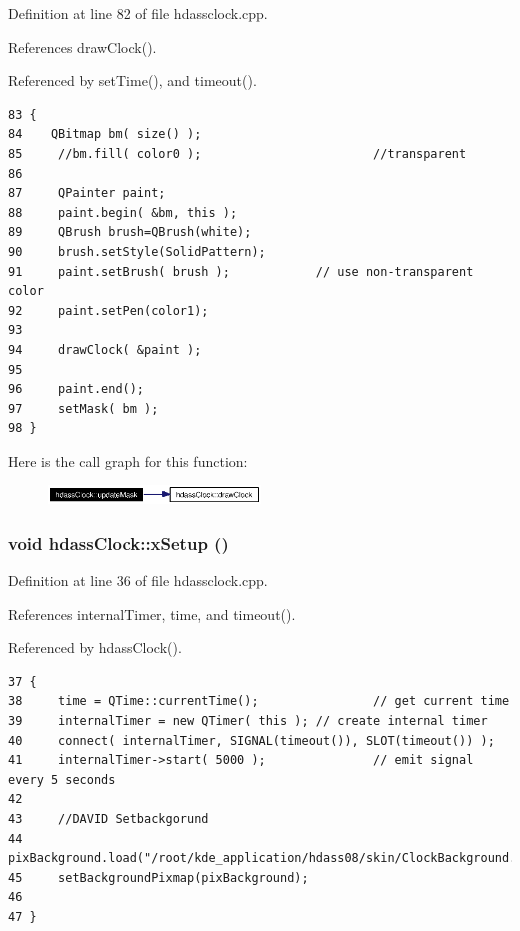 Definition at line 82 of file hdassclock.cpp.

References draw\-Clock().

Referenced by set\-Time(), and timeout().



\footnotesize\begin{verbatim}83 {
84    QBitmap bm( size() );
85     //bm.fill( color0 );                        //transparent
86 
87     QPainter paint;
88     paint.begin( &bm, this );
89     QBrush brush=QBrush(white);
90     brush.setStyle(SolidPattern); 
91     paint.setBrush( brush );            // use non-transparent color
92     paint.setPen(color1);
93 
94     drawClock( &paint );
95 
96     paint.end();
97     setMask( bm );
98 }
\end{verbatim}\normalsize 


Here is the call graph for this function:\begin{figure}[H]
\begin{center}
\leavevmode
\includegraphics[width=160pt]{classhdassClock_hdassClockb0_cgraph}
\end{center}
\end{figure}
\subsubsection{\setlength{\rightskip}{0pt plus 5cm}void hdass\-Clock::x\-Setup ()}\label{classhdassClock_hdassClocka1}




Definition at line 36 of file hdassclock.cpp.

References internal\-Timer, time, and timeout().

Referenced by hdass\-Clock().



\footnotesize\begin{verbatim}37 {
38     time = QTime::currentTime();                // get current time
39     internalTimer = new QTimer( this ); // create internal timer
40     connect( internalTimer, SIGNAL(timeout()), SLOT(timeout()) );
41     internalTimer->start( 5000 );               // emit signal every 5 seconds
42     
43     //DAVID Setbackgorund
44     pixBackground.load("/root/kde_application/hdass08/skin/ClockBackground.png");
45     setBackgroundPixmap(pixBackground);
46     
47 }
\end{verbatim}\normalsize 


